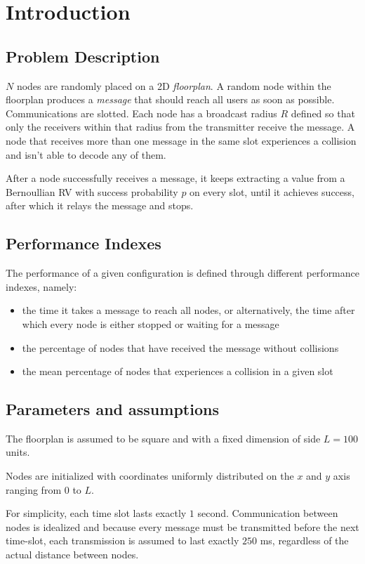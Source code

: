 \section{Introduction}
\subsection{Problem Description}
$N$ nodes are randomly placed on a 2D \textit{floorplan}. A random node within the floorplan produces a \textit{message} that should reach all users as soon as possible. Communications are slotted. Each node has a broadcast radius $R$ defined so that only the receivers within that radius from the transmitter receive the message. A node that receives more than one message in the same slot experiences a collision and isn't able to decode any of them.

After a node successfully receives a message, it keeps extracting a value from a Bernoullian RV with success probability $p$ on every slot, until it achieves success, after which it relays the message and stops.

\subsection{Performance Indexes}
The performance of a given configuration is defined through different performance indexes, namely:
\begin{itemize}
\item the time it takes a message to reach all nodes, or alternatively, the time after which every node is either stopped or waiting for a message
\item the percentage of nodes that have received the message without collisions
\item the mean percentage of nodes that experiences a collision in a given slot
\end{itemize}
\subsection{Parameters and assumptions}
The floorplan is assumed to be square and with a fixed dimension of side $L = 100$ units.

Nodes are initialized with coordinates uniformly distributed on the $x$ and $y$ axis ranging from $0$ to $L$.

For simplicity, each time slot lasts exactly $1$ second. Communication between nodes is idealized and because every message must be transmitted before the next time-slot, each transmission is assumed to last exactly $250$ ms, regardless of the actual distance between nodes.

